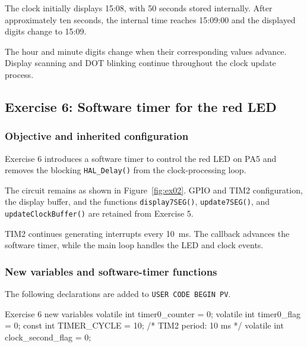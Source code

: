 \documentclass[a4paper]{article}
\begin{document}
The clock initially displays 15:08, with
50 seconds stored internally. After approximately
ten seconds, the internal time reaches 15:09:00
and the displayed digits change to 15:09.

The hour and minute digits change when their
corresponding values advance. Display scanning
and DOT blinking continue throughout the clock
update process.


\subsection{Exercise 6: Software timer for the red LED}

\subsubsection{Objective and inherited configuration}

Exercise 6 introduces a software timer to control
the red LED on PA5 and removes the blocking
\texttt{HAL\_Delay()} from the clock-processing loop.

The circuit remains as shown in Figure~\ref{fig:ex02}.
GPIO and TIM2 configuration, the display buffer,
and the functions \texttt{display7SEG()},
\texttt{update7SEG()}, and
\texttt{updateClockBuffer()} are retained
from Exercise 5.

TIM2 continues generating interrupts every 10~ms.
The callback advances the software timer, while
the main loop handles the LED and clock events.

\subsubsection{New variables and software-timer functions}

The following declarations are added to
\texttt{USER CODE BEGIN PV}.

\begin{stmcode}{Exercise 6 new variables}
volatile int timer0_counter = 0;
volatile int timer0_flag = 0;
const int TIMER_CYCLE = 10;       /* TIM2 period: 10 ms */
volatile int clock_second_flag = 0;
\end{stmcode}
\end{document}
